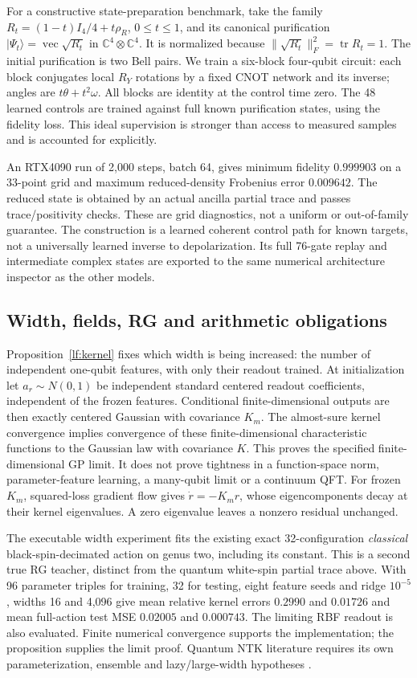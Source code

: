 \documentclass[11pt]{article}
\theoremstyle{definition}\newtheorem{definition}[theorem]{Definition}
\theoremstyle{remark}\newtheorem{remark}[theorem]{Remark}
\begin{document}
For a constructive state-preparation benchmark, take the family
$R_t=(1-t)I_4/4+t\rho_R$, $0\leq t\leq1$, and its canonical purification
$|\Psi_t\rangle=\operatorname{vec}\sqrt{R_t}$ in
$\mathbb C^4\otimes\mathbb C^4$. It is normalized because
$\|\sqrt{R_t}\|_F^2=\operatorname{tr}R_t=1$.
The initial purification is two Bell pairs. We train a six-block four-qubit
circuit: each block conjugates local $R_Y$ rotations by a fixed CNOT network
and its inverse; angles are $t\theta+t^2\omega$. All blocks are identity at
the control time zero. The 48 learned controls are trained against full
known purification states, using the fidelity loss. This ideal supervision
is stronger than access to measured samples and is accounted for explicitly.

An RTX4090 run of 2,000 steps, batch 64, gives minimum fidelity $0.999903$
on a 33-point grid and maximum reduced-density Frobenius error $0.009642$.
The reduced state is obtained by an actual ancilla partial trace and passes
trace/positivity checks. These are grid diagnostics, not a uniform or
out-of-family guarantee. The construction is a learned coherent control
path for known targets, not a universally learned inverse to depolarization.
Its full 76-gate replay and intermediate complex states are exported to the
same numerical architecture inspector as the other models.

\subsection{Width, fields, RG and arithmetic obligations}
Proposition~\ref{lf:kernel} fixes which width is being increased: the number
of independent one-qubit features, with only their readout trained.
At initialization let $a_r\sim N(0,1)$ be independent standard centered
readout coefficients, independent of the frozen features. Conditional
finite-dimensional outputs are then exactly centered Gaussian with
covariance $K_m$. The almost-sure kernel
convergence implies convergence of these finite-dimensional characteristic
functions to the Gaussian law with covariance $K$. This proves the specified
finite-dimensional GP limit. It does not prove tightness in a function-space
norm, parameter-feature learning, a many-qubit limit or a continuum QFT.
For frozen $K_m$, squared-loss gradient flow gives
$\dot r=-K_mr$, whose eigencomponents decay at their kernel eigenvalues.
A zero eigenvalue leaves a nonzero residual unchanged.

The executable width experiment fits the existing exact 32-configuration
\emph{classical} black-spin-decimated action on genus two, including its
constant. This is a second true RG teacher, distinct from the quantum
white-spin partial trace above. With 96 parameter triples for training,
32 for testing, eight feature seeds and ridge $10^{-5}$, widths 16 and
4,096 give mean relative kernel errors $0.2990$ and $0.01726$ and mean
full-action test MSE $0.02005$ and $0.000743$. The limiting RBF readout is
also evaluated. Finite numerical convergence supports the implementation;
the proposition supplies the limit proof. Quantum NTK literature requires
its own parameterization, ensemble and lazy/large-width hypotheses
\cite{LFQNTK,LFNTK}.
\end{document}
